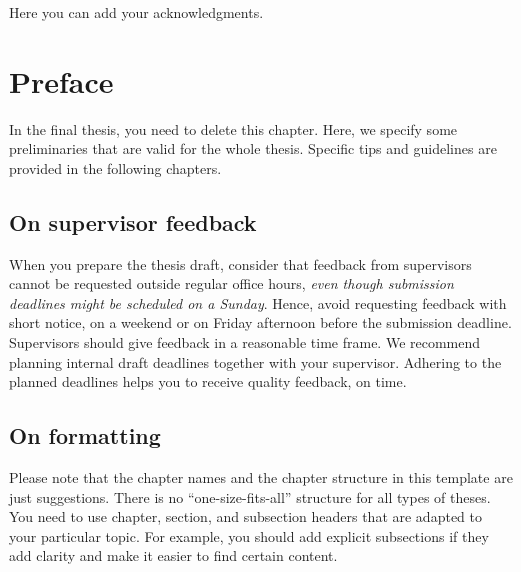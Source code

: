 \documentclass[a4paper,twoside]{bth}
\begin{document}
\acknowledgments %
\noindent
Here you can add your acknowledgments.

\cleardoublepage


\setcounter{secnumdepth}{3} %
\tableofcontents

\cleardoublepage
\pagestyle{headings}


\chapter{Preface}
In the final thesis, you need to delete this chapter. Here, we specify some preliminaries that are valid for the whole thesis. Specific tips and guidelines are provided in the following chapters.



\section{On supervisor feedback}
When you prepare the thesis draft, consider that feedback from supervisors cannot be requested outside regular office hours, \emph{even though submission deadlines might be scheduled on a Sunday}. Hence, avoid requesting feedback with short notice, on a weekend or on Friday afternoon before the submission deadline. Supervisors should give feedback in a reasonable time frame. We recommend planning internal draft deadlines together with your supervisor. Adhering to the planned deadlines helps you to receive quality feedback, on time. 


\section{On formatting}
Please note that the chapter names and the chapter structure in this template are
just suggestions. There is no ``one-size-fits-all'' structure for all types of theses.
You need to use chapter, section, and subsection headers that are adapted to your
particular topic. For example, you should add explicit subsections if they add clarity and make it easier to find certain content. 
\end{document}
